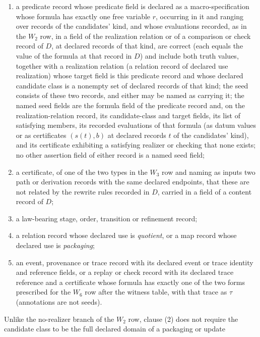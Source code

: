 \begin{definition}
\begin{enumerate}[label=(\arabic*),topsep=2pt,itemsep=1pt]
references as its source relation, or with the relation record
serving as source relation in a cluster satisfying \(W_1\) that contains it;
  \item a predicate record
whose predicate field is declared as a macro-specification whose formula has
exactly one free variable \(r\), occurring in it and ranging over records of
the candidates' kind, and whose evaluations recorded, as in the \(W_2\) row, in a field of the realization relation or of a comparison or check record of \(D\), at declared records of
that kind, are correct (each equals the value of the formula at that record in
\(D\)) and include both truth values, together with a
realization relation (a relation record of declared use realization) whose target field is this predicate record and whose declared candidate class is a nonempty set of declared records of that kind; the seed consists of these two records, and either may be named as carrying it; the named seed fields are the formula field of the predicate record and, on
the realization-relation record, its candidate-class and target fields, its
list of satisfying members, its recorded evaluations of that formula (as datum
values or as certificates \((s(t),b)\) at declared records \(t\) of the
candidates' kind), and its certificate exhibiting a satisfying realizer or
checking that none exists; no other assertion field of either record is a named
seed field;
  \item a certificate, of one of the two types in the \(W_3\) row and naming as inputs two path or derivation records with the same declared endpoints, that these are not related by the rewrite rules recorded in \(D\), carried in a field of a content record of \(D\);
  \item a
law-bearing stage, order, transition or refinement record;
  \item a relation record whose
declared use is \emph{quotient}, or a map record whose declared use is \emph{packaging};
  \item an event, provenance or trace record with its declared event or trace
identity and reference fields, or a replay or check record with its declared
trace reference and a certificate whose formula has exactly one of the two forms prescribed for the \(W_6\) row after the witness table, with that trace as \(\tau\) (annotations are not
seeds).
\end{enumerate}
Unlike the no-realizer branch of the \(W_2\) row, clause (2) does not require
the candidate class to be the full declared domain of a packaging or update

\end{definition}
